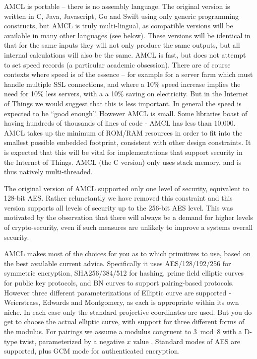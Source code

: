 \documentclass{llncs}
\begin{document}
AMCL is portable -- there is no assembly language. The original version is written in C, Java, Javascript, Go and Swift using only generic programming constructs, but AMCL is truly 
multi-lingual, as compatible 
versions will be available in many other languages (see below). These versions will be identical in that for the same inputs they will not only produce the same outputs, but all internal calculations will also be the same. 
AMCL is fast, but does not attempt to set speed records (a particular academic obsession). There are of course contexts where speed is of the essence -- for example for a server farm which must handle 
multiple SSL connections, and where a 10\% speed increase implies the need for 10\% less servers, with a a 10\% saving on electricity. But in the Internet of Things we would suggest that this is less 
important. In general the speed
is expected to be ``good enough''. However AMCL is small. Some libraries boast of having hundreds of thousands of lines of code - AMCL has less than 10,000. AMCL takes up the minimum of 
ROM/RAM resources in order to fit into the smallest possible embedded footprint, consistent with other design constraints. It is expected that this will be vital for implementations that 
support security in the Internet of Things. AMCL (the C version) only uses stack memory, and is thus natively multi-threaded.

The original version of AMCL supported only one level of security, equivalent to 128-bit AES. Rather relunctantly we have removed this constraint and this version supports all levels of security up to
the 256-bit AES level. This was motivated by the observation that there will always be a demand for higher levels of crypto-security, even if such measures are unlikely to improve a systems overall security. 

AMCL makes most 
of the choices for you as to which primitives to use, based on the best available current advice. Specifically it uses AES/128/192/256 for symmetric encryption, SHA256/384/512 for hashing, prime field elliptic
curves for public key protocols, and BN curves to support pairing-based protocols. However three different parameterizations of Elliptic curve are supported - Weierstrass, Edwards and 
Montgomery, as each is appropriate within its own niche. In each case only the standard projective coordinates are used. But you do get to 
choose the actual elliptic curve, with support for three different 
forms of the modulus. For pairings we assume a modulus congruent to $3 \bmod 8$ with a D-type twist, parameterized by a negative $x$ value \cite{barreto-naehrig}.
Standard modes of AES are supported, plus GCM mode for authenticated encryption.
\end{document}
